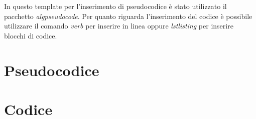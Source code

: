 In questo template per l'inserimento di pseudocodice è stato utilizzato il pacchetto \textit{algpseudocode}. Per quanto riguarda l'inserimento del codice è possibile utilizzare il comando \textit{verb} per inserire in linea oppure \textit{lstlisting} per inserire blocchi di codice.

\section{Pseudocodice}


\section{Codice}
